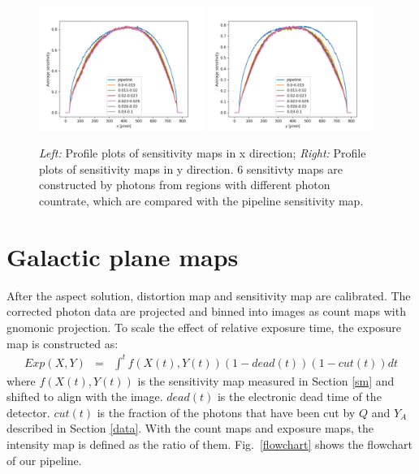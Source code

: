 \documentclass[12pt, preprint]{aastex}
\begin{document}
\begin{figure}[p]
\begin{center}
\includegraphics[width=0.48\textwidth]{figures/profile_x}
\includegraphics[width=0.48\textwidth]{figures/profile_y}
\end{center}
\caption{
  \label{flat-field}
  \emph{Left:} Profile plots of sensitivity maps in x direction;
  \emph{Right:} Profile plots of sensitivity maps in y direction.
  6 sensitivty maps are constructed by photons from regions with different photon countrate, which are compared with the pipeline sensitivity map.
}
\end{figure}


\section{Galactic plane maps}
\label{maps}
After the aspect solution, distortion map and sensitivity map are calibrated.
The corrected photon data are projected and binned into images as count maps with gnomonic projection.
To scale the effect of relative exposure time, the exposure map is constructed as:
\begin{eqnarray}
Exp(X,Y) &=& \int^{t}f(X(t), Y(t))(1-dead(t))(1-cut(t))dt
\end{eqnarray}
where $f(X(t), Y(t))$ is the sensitivity map measured in Section \ref{sm} and shifted to align with the image.
$dead(t)$ is the electronic dead time of the detector.
$cut(t)$ is the fraction of the photons that have been cut by $Q$ and $Y_A$ described in Section \ref{data}.
With the count maps and exposure maps, the intensity map is defined as the ratio of them.
Fig.~\ref{flowchart} shows the flowchart of our pipeline.
\end{document}
